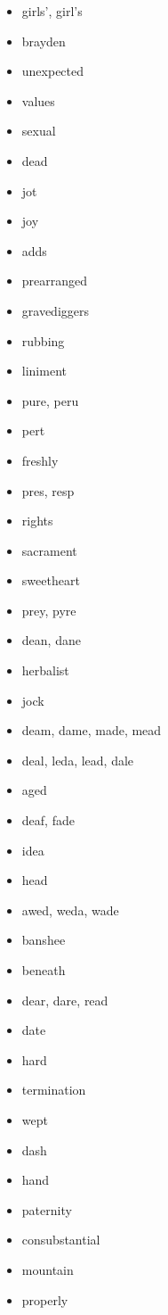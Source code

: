 \documentclass{article}
\begin{document}
\begin{itemize}
    \item girls', girl's
    \item brayden
    \item unexpected
    \item values
    \item sexual
    \item dead
    \item jot
    \item joy
    \item adds
    \item prearranged
    \item gravediggers
    \item rubbing
    \item liniment
    \item pure, peru
    \item pert
    \item freshly
    \item pres, resp
    \item rights
    \item sacrament
    \item sweetheart
    \item prey, pyre
    \item dean, dane
    \item herbalist
    \item jock
    \item deam, dame, made, mead
    \item deal, leda, lead, dale
    \item aged
    \item deaf, fade
    \item idea
    \item head
    \item awed, weda, wade
    \item banshee
    \item beneath
    \item dear, dare, read
    \item date
    \item hard
    \item termination
    \item wept
    \item dash
    \item hand
    \item paternity
    \item consubstantial
    \item mountain
    \item properly

\end{itemize}
\end{document}
